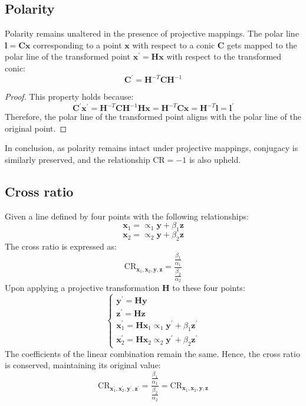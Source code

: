 \subsection{Polarity}
Polarity remains unaltered in the presence of projective mappings.
The polar line $\mathbf{l}=\mathbf{Cx}$ corresponding to a point $\mathbf{x}$ with respect to a conic $\mathbf{C}$ gets mapped to the polar line of the transformed point $\mathbf{x}^\prime = \mathbf{Hx}$ with respect to the transformed conic:
\[\mathbf{C}^\prime=\mathbf{H}^{-T}\mathbf{CH}^{-1}\]
\begin{proof}
    This property holds because:
    \[\mathbf{C}^\prime \mathbf{x}^\prime=\mathbf{H}^{-T}\mathbf{CH}^{-1}\mathbf{Hx}=\mathbf{H}^{-T}\mathbf{Cx}=\mathbf{H}^{-T}\mathbf{l}=\mathbf{l}^\prime\]
    Therefore, the polar line of the transformed point aligns with the polar line of the original point.
\end{proof}
In conclusion, as polarity remains intact under projective mappings, conjugacy is similarly preserved, and the relationship $\text{CR}=-1$ is also upheld.

\subsection{Cross ratio}
Given a line defined by four points with the following relationships:
\[\mathbf{x}_1=\propto_1\mathbf{y}+\beta_1\mathbf{z}\]
\[\mathbf{x}_2=\propto_2\mathbf{y}+\beta_2\mathbf{z}\]
The cross ratio is expressed as:
\[\text{CR}_{\mathbf{x}_1,\mathbf{x}_2,\mathbf{y},\mathbf{z}}=\dfrac{\frac{\beta_1}{\alpha_1}}{\frac{\beta_2}{\alpha_2}}\]
Upon applying a projective transformation $\mathbf{H}$ to these four points:
\[\begin{cases}
    \mathbf{y}^\prime=\mathbf{Hy} \\
    \mathbf{z}^\prime=\mathbf{Hz} \\ 
    \mathbf{x}^\prime_1=\mathbf{H}\mathbf{x}_1\propto_1\mathbf{y}^\prime+\beta_1\mathbf{z}^\prime \\
    \mathbf{x}^\prime_2=\mathbf{H}\mathbf{x}_2\propto_2\mathbf{y}^\prime+\beta_2\mathbf{z}^\prime
\end{cases}\]
The coefficients of the linear combination remain the same. 
Hence, the cross ratio is conserved, maintaining its original value:
\[\text{CR}_{\mathbf{x}_1^\prime,\mathbf{x}_2^\prime,\mathbf{y}^\prime,\mathbf{z}^\prime}=\dfrac{\frac{\beta_1}{\alpha_1}}{\frac{\beta_2}{\alpha_2}}=\text{CR}_{\mathbf{x}_1,\mathbf{x}_2,\mathbf{y},\mathbf{z}}\]


